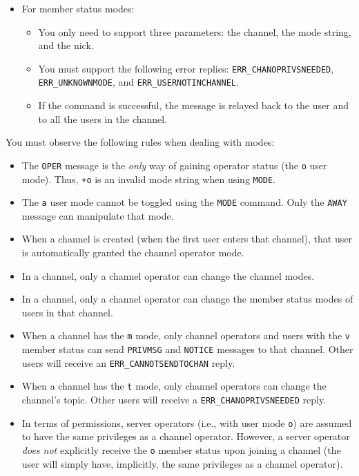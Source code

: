 \documentclass[10pt]{article}
\begin{document}
\begin{itemize}
\item For member status modes:
\begin{itemize}
\item You only need to support three parameters: the channel, the mode string, and the nick.
\item You must support the following error replies: \texttt{ERR\_CHANOPRIVSNEEDED}, \texttt{ERR\_UNKNOWNMODE}, and \texttt{ERR\_USERNOTINCHANNEL}.
\item If the command is successful, the message is relayed back to the user and to all the users in the channel.
\end{itemize}

\end{itemize}

You must observe the following rules when dealing with modes:

\begin{itemize}
\item The \texttt{OPER} message is the \emph{only} way of gaining operator status (the \texttt{o} user mode). Thus, \texttt{+o} is an invalid mode string when using \texttt{MODE}.
\item The \texttt{a} user mode cannot be toggled using the \texttt{MODE} command. Only the \texttt{AWAY} message can manipulate that mode.
\item When a channel is created (when the first user enters that channel), that user is automatically granted the channel operator mode.
\item In a channel, only a channel operator can change the channel modes.
\item In a channel, only a channel operator can change the member status modes of users in that channel.
\item When a channel has the \texttt{m} mode, only channel operators and users with the \texttt{v} member status can send \texttt{PRIVMSG} and \texttt{NOTICE} messages to that channel. Other users will receive an \texttt{ERR\_CANNOTSENDTOCHAN} reply.
\item When a channel has the \texttt{t} mode, only channel operators can change the channel's topic. Other users will receive a \texttt{ERR\_CHANOPRIVSNEEDED} reply.
\item In terms of permissions, server operators (i.e., with user mode \texttt{o}) are assumed to have the same privileges as a channel operator. However, a server operator \emph{does not} explicitly receive the \texttt{o} member status upon joining a channel (the user will simply have, implicitly, the same privileges as a channel operator).
\end{itemize}
\end{document}
